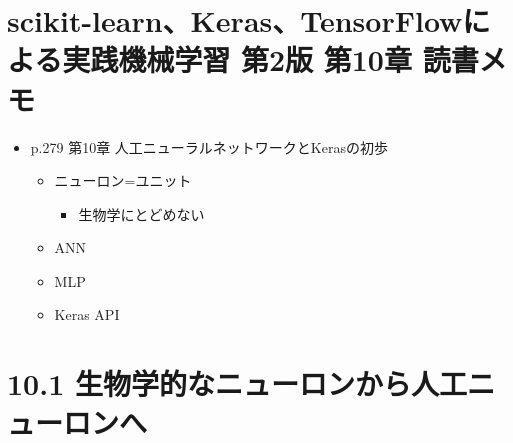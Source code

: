 \hypertarget{scikit-learnkerastensorflowux306bux3088ux308bux5b9fux8df5ux6a5fux68b0ux5b66ux7fd2-ux7b2c2ux7248-ux7b2c10ux7ae0-ux8aadux66f8ux30e1ux30e2}{%
\section{scikit-learn、Keras、TensorFlowによる実践機械学習 第2版 第10章
読書メモ}\label{scikit-learnkerastensorflowux306bux3088ux308bux5b9fux8df5ux6a5fux68b0ux5b66ux7fd2-ux7b2c2ux7248-ux7b2c10ux7ae0-ux8aadux66f8ux30e1ux30e2}}

\begin{itemize}
\tightlist
\item
  p.279 第10章 人工ニューラルネットワークとKerasの初歩

  \begin{itemize}
  \tightlist
  \item
    ニューロン=ユニット

    \begin{itemize}
    \tightlist
    \item
      生物学にとどめない
    \end{itemize}
  \item
    ANN
  \item
    MLP
  \item
    Keras API
  \end{itemize}
\end{itemize}

\hypertarget{ux751fux7269ux5b66ux7684ux306aux30cbux30e5ux30fcux30edux30f3ux304bux3089ux4ebaux5de5ux30cbux30e5ux30fcux30edux30f3ux3078}{%
\section{10.1
生物学的なニューロンから人工ニューロンへ}\label{ux751fux7269ux5b66ux7684ux306aux30cbux30e5ux30fcux30edux30f3ux304bux3089ux4ebaux5de5ux30cbux30e5ux30fcux30edux30f3ux3078}}

